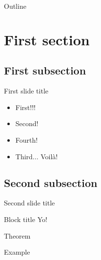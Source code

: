 %
%

\begin{frame}
  \titlepage
\end{frame}

\begin{frame}{Outline}
  \tableofcontents
\end{frame}


\section{First section}
\subsection{First subsection}

\begin{frame}{First slide title}
	\begin{itemize}
		\item {
			First!!!
			\pause
		}
		\item {
			Second!
		}
		\item<4-> {
			Fourth!
		}
		\item<3-> {
			Third... \uncover<5-> {Voil\`{a}!}
		}
	\end{itemize}
\end{frame}

\subsection{Second subsection}

\begin{frame}{Second slide title}
	\begin{block}{Block title}
		Yo!
	\end{block}
	\begin{theorem}
		Theorem
	\end{theorem}
	\begin{example}
		Example
	\end{example}
\end{frame}

